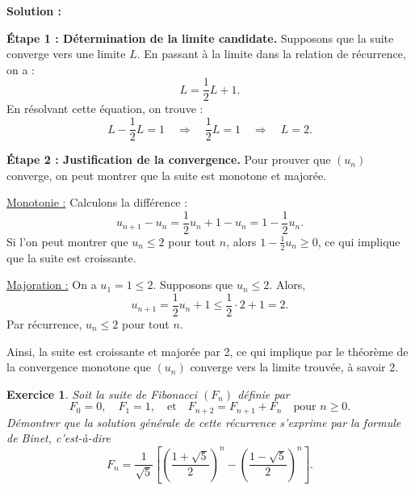 \documentclass[11pt,twoside,openany]{book}
\newtheorem{exercice}{Exercice}[chapter]%
\newenvironment{solution}{\par\textbf{Solution :}\par\small}{\normalsize\par}
\begin{document}
\begin{solution}
\textbf{Étape 1 : Détermination de la limite candidate.}  
Supposons que la suite converge vers une limite $L$. En passant à la limite dans la relation de récurrence, on a :
\[
L = \frac{1}{2}L + 1.
\]
En résolvant cette équation, on trouve :
\[
L - \frac{1}{2}L = 1 \quad \Longrightarrow \quad \frac{1}{2}L = 1 \quad \Longrightarrow \quad L = 2.
\]

\medskip %

\textbf{Étape 2 : Justification de la convergence.}  
Pour prouver que $(u_n)$ converge, on peut montrer que la suite est monotone et majorée.

\medskip %

\underline{Monotonie :}  
Calculons la différence :
\[
u_{n+1} - u_n = \frac{1}{2}u_n + 1 - u_n = 1 - \frac{1}{2}u_n.
\]
Si l'on peut montrer que $u_n \leq 2$ pour tout $n$, alors $1-\frac{1}{2}u_n \geq 0$, ce qui implique que la suite est croissante.

\medskip

\underline{Majoration :}  %
On a $u_1=1 \leq 2$. Supposons que $u_n \leq 2$. Alors,
\[
u_{n+1} = \frac{1}{2}u_n + 1 \leq \frac{1}{2}\cdot 2 + 1 = 2.
\]
Par récurrence, $u_n \leq 2$ pour tout $n$. 

Ainsi, la suite est croissante et majorée par 2, ce qui implique par le théorème de la convergence monotone que $(u_n)$ converge vers la limite trouvée, à savoir 2.
\end{solution}
\begin{exercice}
Soit la suite de Fibonacci \((F_n)\) définie par 
\[
F_0=0,\quad F_1=1,\quad \text{et} \quad F_{n+2}=F_{n+1}+F_n \quad \text{pour } n\ge 0.
\]
Démontrer que la solution générale de cette récurrence s'exprime par la formule de Binet, c'est-à-dire
\[
F_n = \frac{1}{\sqrt{5}}\left[\left(\frac{1+\sqrt{5}}{2}\right)^n - \left(\frac{1-\sqrt{5}}{2}\right)^n\right].
\]

\end{exercice}
\end{document}
